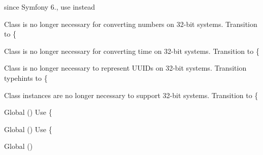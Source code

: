 \begin{DoxyRefList}
%
since Symfony 6., use  instead  
\item[Class \doxylink{class_ramsey_1_1_uuid_1_1_converter_1_1_number_1_1_degraded_number_converter}{Degraded\+Number\+Converter} ]\label{deprecated__deprecated000285}%
%
 is no longer necessary for converting numbers on 32-\/bit systems. Transition to \{ 
\item[Class \doxylink{class_ramsey_1_1_uuid_1_1_converter_1_1_time_1_1_degraded_time_converter}{Degraded\+Time\+Converter} ]\label{deprecated__deprecated000287}%
%
 is no longer necessary for converting time on 32-\/bit systems. Transition to \{ 
\item[Class \doxylink{class_ramsey_1_1_uuid_1_1_degraded_uuid}{Degraded\+Uuid} ]\label{deprecated__deprecated000288}%
%
 is no longer necessary to represent UUIDs on 32-\/bit systems. Transition typehints to \{ 
\item[Class \doxylink{class_ramsey_1_1_uuid_1_1_builder_1_1_degraded_uuid_builder}{Degraded\+Uuid\+Builder} ]\label{deprecated__deprecated000283}%
%
 instances are no longer necessary to support 32-\/bit systems. Transition to \{ 
\item[Global \doxylink{interface_ramsey_1_1_uuid_1_1_deprecated_uuid_interface_a4064a5c9a6c20cfdc25d6dfc79aa4ea5}{Deprecated\+Uuid\+Interface\+::get\+Clock\+Seq\+Hi\+And\+Reserved\+Hex} ()]\label{deprecated__deprecated000291}%
%
Use \{ 
\item[Global \doxylink{interface_ramsey_1_1_uuid_1_1_deprecated_uuid_interface_a8bbc61bf61b26dc4cb1c44deb306a95a}{Deprecated\+Uuid\+Interface\+::get\+Clock\+Seq\+Low\+Hex} ()]\label{deprecated__deprecated000292}%
%
Use \{ 
\item[Global \doxylink{interface_ramsey_1_1_uuid_1_1_deprecated_uuid_interface_a1a7e4340050f5494cbbc3366977e3cf2}{Deprecated\+Uuid\+Interface\+::get\+Clock\+Sequence\+Hex} ()]\label{deprecated__deprecated000293}%

\end{DoxyRefList}
